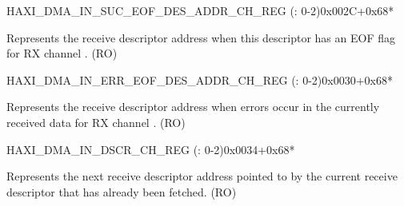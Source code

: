\begin{register}{H}{AXI\_DMA\_IN\_SUC\_EOF\_DES\_ADDR\_CH\_REG (: 0-2)}{0x002C+0x68*}\label{regdesc:AXIDMAINSUCEOFDESADDRCHNREG}
%
\regnewline%
\begin{regdesc}\begin{reglist}
\label{fielddesc:AXIDMAINSUCEOFDESADDRCHN}\item [AXI\_DMA\_IN\_SUC\_EOF\_DES\_ADDR\_CH\regindex{n}] Represents the receive descriptor address when this descriptor has an EOF flag for RX channel . (RO)
\end{reglist}\end{regdesc}
\end{register}


\begin{register}{H}{AXI\_DMA\_IN\_ERR\_EOF\_DES\_ADDR\_CH\_REG (: 0-2)}{0x0030+0x68*}\label{regdesc:AXIDMAINERREOFDESADDRCHNREG}
%
\regnewline%
\begin{regdesc}\begin{reglist}
\label{fielddesc:AXIDMAINERREOFDESADDRCHN}\item [AXI\_DMA\_IN\_ERR\_EOF\_DES\_ADDR\_CH\regindex{n}] Represents the receive descriptor address when errors occur in the currently received data for RX channel . (RO)
\end{reglist}\end{regdesc}
\end{register}


\begin{register}{H}{AXI\_DMA\_IN\_DSCR\_CH\_REG (: 0-2)}{0x0034+0x68*}\label{regdesc:AXIDMAINDSCRCHNREG}
%
\regnewline%
\begin{regdesc}\begin{reglist}
\label{fielddesc:AXIDMAINLINKDSCRCHN}\item [AXI\_DMA\_INLINK\_DSCR\_CH\regindex{n}] Represents the next receive descriptor address pointed to by the current receive descriptor that has already been fetched. (RO)
\end{reglist}\end{regdesc}
\end{register}


